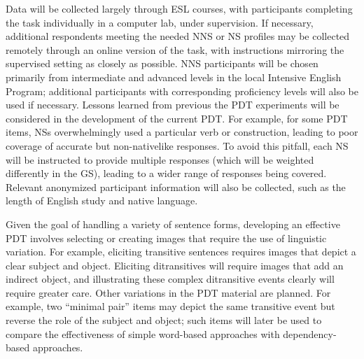 \documentclass[11pt]{article}
\begin{document}
\par Data will be collected largely through ESL courses, with participants completing the task individually in a computer lab, under supervision. If necessary, additional respondents meeting the needed NNS or NS profiles may be collected remotely through an online version of the task, with instructions mirroring the supervised setting as closely as possible. NNS participants will be chosen primarily from intermediate and advanced levels in the local Intensive English Program; additional participants with corresponding proficiency levels will also be used if necessary. Lessons learned from previous the PDT experiments will be considered in the development of the current PDT. For example, for some PDT items, NSs overwhelmingly used a particular verb or construction, leading to poor coverage of accurate but non-nativelike responses. To avoid this pitfall, each NS will be instructed to provide multiple responses (which will be weighted differently in the GS), leading to a wider range of responses being covered.
Relevant anonymized participant information will also be collected, such as the length of English study and native language.
\par Given the goal of handling a variety of sentence forms, developing an effective PDT involves selecting or creating images that require the use of linguistic variation. For example, eliciting transitive sentences requires images that depict a clear subject and object. Eliciting ditransitives will require images that add an indirect object, and illustrating these complex ditransitive events clearly will require greater care. Other variations in the PDT material are planned. For example, two ``minimal pair'' items may depict the same transitive event but reverse the role of the subject and object; such items will later be used to compare the effectiveness of simple word-based approaches with dependency-based approaches. 
\end{document}
